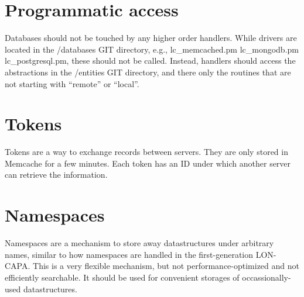 \section{Programmatic access}
Databases should not be touched by any higher order handlers. While drivers are located in the /databases GIT directory, e.g., lc\_memcached.pm  lc\_mongodb.pm  lc\_postgresql.pm, these should not be called. Instead, handlers should access the abstractions in the /entities GIT directory, and there only the routines that are not starting with ``remote'' or ``local''.

\section{Tokens}\label{token}
Tokens are a way to exchange records between servers. They are only stored in Memcache for a few minutes. Each token has an ID under which another server can retrieve the information.

\section{Namespaces}\label{namespace}
Namespaces are a mechanism to store away datastructures under arbitrary names, similar to how namespaces are handled in the first-generation LON-CAPA. This is a very flexible mechanism, but not performance-optimized and not efficiently searchable. It should be used for convenient storages of occassionally-used datastructures.  


